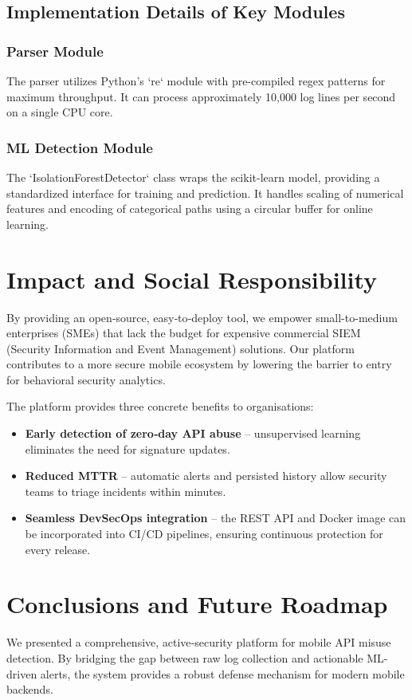 \documentclass[preprint,12pt,a4paper]{elsarticle}
\begin{document}
\subsection{Implementation Details of Key Modules}
\subsubsection{Parser Module}
The parser utilizes Python's `re` module with pre-compiled regex patterns for maximum throughput. It can process approximately 10,000 log lines per second on a single CPU core.
\subsubsection{ML Detection Module}
The `IsolationForestDetector` class wraps the scikit-learn model, providing a standardized interface for training and prediction. It handles scaling of numerical features and encoding of categorical paths using a circular buffer for online learning.

\section{Impact and Social Responsibility}
By providing an open‑source, easy‑to‑deploy tool, we empower small-to-medium enterprises (SMEs) that lack the budget for expensive commercial SIEM (Security Information and Event Management) solutions. Our platform contributes to a more secure mobile ecosystem by lowering the barrier to entry for behavioral security analytics.

The platform provides three concrete benefits to organisations:
\begin{itemize}
  \item \textbf{Early detection of zero‑day API abuse} – unsupervised learning eliminates the need for signature updates.
  \item \textbf{Reduced MTTR} – automatic alerts and persisted history allow security teams to triage incidents within minutes.
  \item \textbf{Seamless DevSecOps integration} – the REST API and Docker image can be incorporated into CI/CD pipelines, ensuring continuous protection for every release.
\end{itemize}


\section{Conclusions and Future Roadmap}
We presented a comprehensive, active‑security platform for mobile API misuse detection. By bridging the gap between raw log collection and actionable ML-driven alerts, the system provides a robust defense mechanism for modern mobile backends.
\end{document}
